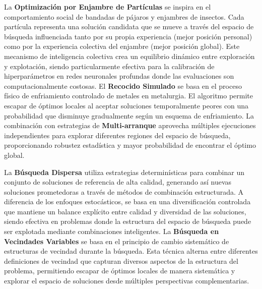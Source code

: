 La \textbf{Optimización por Enjambre de Partículas} \cite{kennedy1995particle, eberhart1995particle} se inspira en el comportamiento social de bandadas de pájaros y enjambres de insectos. Cada partícula representa una solución candidata que se mueve a través del espacio de búsqueda influenciada tanto por su propia experiencia (mejor posición personal) como por la experiencia colectiva del enjambre (mejor posición global). Este mecanismo de inteligencia colectiva crea un equilibrio dinámico entre exploración y explotación, siendo particularmente efectiva para la calibración de hiperparámetros en redes neuronales profundas donde las evaluaciones son computacionalmente costosas. El \textbf{Recocido Simulado} \cite{kirkpatrick1983optimization} se basa en el proceso físico de enfriamiento controlado de metales en metalurgia. El algoritmo permite escapar de óptimos locales al aceptar soluciones temporalmente peores con una probabilidad que disminuye gradualmente según un esquema de enfriamiento. La combinación con estrategias de \textbf{Multi-arranque} \cite{marti2018multistart} aprovecha múltiples ejecuciones independientes para explorar diferentes regiones del espacio de búsqueda, proporcionando robustez estadística y mayor probabilidad de encontrar el óptimo global.

La \textbf{Búsqueda Dispersa} \cite{glover1998template} utiliza estrategias determinísticas para combinar un conjunto de soluciones de referencia de alta calidad, generando así nuevas soluciones prometedoras a través de métodos de combinación estructurada. A diferencia de los enfoques estocásticos, se basa en una diversificación controlada que mantiene un balance explícito entre calidad y diversidad de las soluciones, siendo efectiva en problemas donde la estructura del espacio de búsqueda puede ser explotada mediante combinaciones inteligentes. La \textbf{Búsqueda en Vecindades Variables} \cite{mladenovic1997variable} se basa en el principio de cambio sistemático de estructuras de vecindad durante la búsqueda. Esta técnica alterna entre diferentes definiciones de vecindad que capturan diversos aspectos de la estructura del problema, permitiendo escapar de óptimos locales de manera sistemática y explorar el espacio de soluciones desde múltiples perspectivas complementarias.

